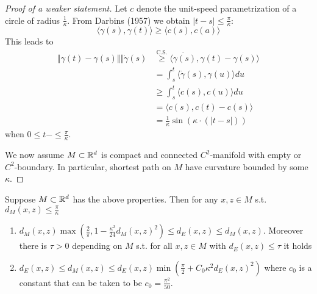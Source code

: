 \begin{proof}[Proof of a weaker statement]
    Let $c$ denote the unit-speed parametrization of a circle of radius $\frac{1}{\kappa}$. From Darbins (1957) we obtain 
    $|t-s|\leq \frac{\pi}{\kappa}$:
    \[\langle \gamma(s), \gamma(t)\rangle \geq \langle c(s),c(a)\rangle\]
    This leads to \begin{align*}
        \Vert \gamma(t)-\gamma(s)\Vert \Vert \dot{\gamma}(s)&\stackrel{\text{C.S.}}{\geq}\langle \dot{\gamma(s)},\gamma(t)-\gamma(s)\rangle\\
        & = \int_s^t\langle \dot{\gamma}(s),\gamma(u)\rangle du\\
        &\geq \int_s^t\langle c(s),c(u)\rangle du\\
        &=\langle c(s),c(t)-c(s)\rangle\\
        &=\frac{1}{\kappa}\sin(\kappa\cdot(|t-s|))
    \end{align*}
    when $0\leq t-\leq \frac{\pi}{\kappa}$.

    We now assume $M\subset \mathbb{R}^d$ is compact and connected $C^2$-manifold with empty or $C^2$-boundary. In particular, shortest path on $M$ have curvature bounded by some $\kappa$.
\end{proof}

\begin{lemma}\label{lem:2.14}
    Suppose $M\subset \mathbb{R}^d$ has the above properties. Then for any $x,z\in M$ s.t. $d_M(x,z)\leq \frac{\pi}{\kappa}$
    \begin{enumerate}
        \item $d_M(x,z)\max\left(\frac{2}{\pi},1-\frac{\kappa^2}{24}d_M(x,z)^2\right)\leq d_E(x,z)\leq d_M(x,z)$. Moreover there is $\tau>0$ depending on $M$ s.t. for all $x,z\in M$ with 
        $d_E(x,z)\leq \tau$ it holds
        \item $d_E(x,z)\leq d_M(x,z)\leq d_E(x,z)\min\left(\frac{\pi}{2}+C_0\kappa^2d_E(x,z)^2\right)$ where $c_0$ is a constant that can be taken to be $c_0=\frac{\pi^2}{50}$.
    \end{enumerate}
\end{lemma}

